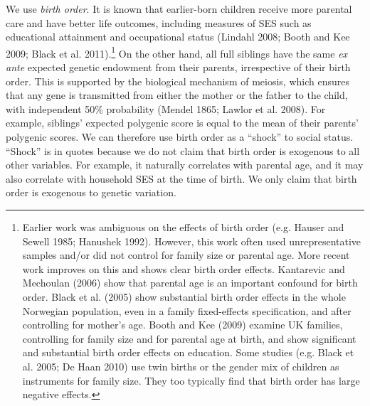 \documentclass[
  12pt,
]{article}
\theoremstyle{definition}
\theoremstyle{definition}
\theoremstyle{definition}
\theoremstyle{definition}
\theoremstyle{remark}
\begin{document}
We use \emph{birth order}. It is known that earlier-born children receive
more parental care and have better life outcomes, including measures of
SES such as educational attainment and occupational status
(Lindahl 2008; Booth and Kee 2009; Black et al. 2011).\footnote{Earlier work was ambiguous on the effects of birth order (e.g. Hauser and Sewell 1985; Hanushek 1992). However, this work often used
  unrepresentative samples and/or did not control for family size or
  parental age. More recent work improves on this and shows clear
  birth order effects. Kantarevic and Mechoulan (2006) show that parental age is
  an important confound for birth order. Black et al. (2005) show
  substantial birth order effects in the whole Norwegian population,
  even in a family fixed-effects specification, and after controlling
  for mother's age. Booth and Kee (2009) examine UK families, controlling
  for family size and for parental age at birth, and show significant
  and substantial birth order effects on education. Some studies (e.g. Black et al. 2005; De Haan 2010) use twin births or the gender mix of
  children as instruments for family size. They too typically find
  that birth order has large negative effects.} On the other
hand, all full siblings have the same \emph{ex ante} expected genetic
endowment from their parents, irrespective of their birth order. This is
supported by the biological mechanism of meiosis, which ensures that any
gene is transmitted from either the mother or the father to the child,
with independent 50\% probability (Mendel 1865; Lawlor et al. 2008). For example, siblings' expected polygenic score
is equal to the mean of their parents' polygenic scores. We can
therefore use birth order as a ``shock'' to social status. ``Shock'' is in
quotes because we do not claim that birth order is exogenous to all
other variables. For example, it naturally correlates with parental age,
and it may also correlate with household SES at the time of birth. We
only claim that birth order is exogenous to genetic variation.
\end{document}
